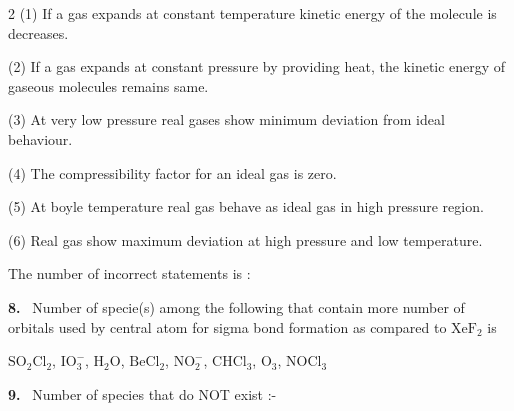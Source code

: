 \documentclass[10pt]{extarticle}
\newcommand{\qn}[1]{\par\smallskip\noindent\textbf{#1.}~}
\begin{document}
\begin{multicols}{2}
(1) If a gas expands at constant temperature kinetic energy of the molecule is decreases.

(2) If a gas expands at constant pressure by providing heat, the kinetic energy of gaseous molecules remains same.

(3) At very low pressure real gases show minimum deviation from ideal behaviour.

(4) The compressibility factor for an ideal gas is zero.

(5) At boyle temperature real gas behave as ideal gas in high pressure region.

(6) Real gas show maximum deviation at high pressure and low temperature.

The number of incorrect statements is :
\qn{8} Number of specie(s) among the following that contain more number of orbitals used by central atom for sigma bond formation as compared to $\mathrm{XeF_2}$ is

$\mathrm{SO_2Cl_2}$, $\mathrm{IO_3^-}$, $\mathrm{H_2O}$, $\mathrm{BeCl_2}$, $\mathrm{NO_2^-}$, $\mathrm{CHCl_3}$, $\mathrm{O_3}$, $\mathrm{NOCl_3}$
\qn{9} Number of species that do NOT exist :-


\end{multicols}
\end{document}
